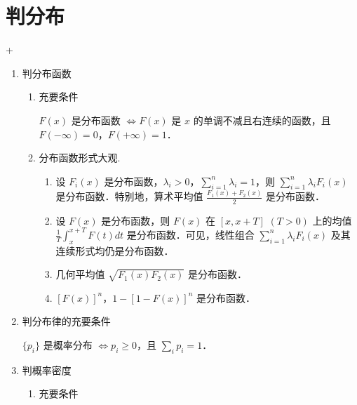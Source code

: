 
\section{判分布}
\DOne + \DTwoTwo
\begin{enumerate}
      \item 判分布函数
            \begin{enumerate}
                  \item 充要条件

                        $F(x)$ 是分布函数 $\Leftrightarrow F(x)$ 是 $x$ 的单调不减且右连续的函数，且 $F(-\infty)=0$，$F(+\infty)=1$．
                  \item 分布函数形式大观.
                        \begin{enumerate}
                              \item 设 $F_i(x)$ 是分布函数，$\lambda_i>0$，$\sum_{i=1}^{n}\lambda_i=1$，则 $\sum_{i=1}^{n}\lambda_iF_i(x)$ 是分布函数．特别地，算术平均值 $\frac{F_1(x)+F_2(x)}{2}$ 是分布函数．
                              \item 设 $F(x)$ 是分布函数，则 $F(x)$ 在 $[x,x+T]$ $(T>0)$ 上的均值 $\frac{1}{T}\int_{x}^{x+T}F(t)dt$ 是分布函数．可见，线性组合 $\sum_{i=1}^{n}\lambda_iF_i(x)$ 及其连续形式均仍是分布函数．
                              \item 几何平均值 $\sqrt{F_1(x)F_2(x)}$ 是分布函数．
                              \item $[F(x)]^n$，$1-[1-F(x)]^n$ 是分布函数．
                        \end{enumerate}
            \end{enumerate}
      \item 判分布律的充要条件

            $\{p_i\}$ 是概率分布 $\Leftrightarrow p_i\geqslant 0$，且 $\sum_{i}p_i=1$．
      \item 判概率密度
            \begin{enumerate}
                  \item 充要条件


\end{enumerate}
\end{enumerate}
